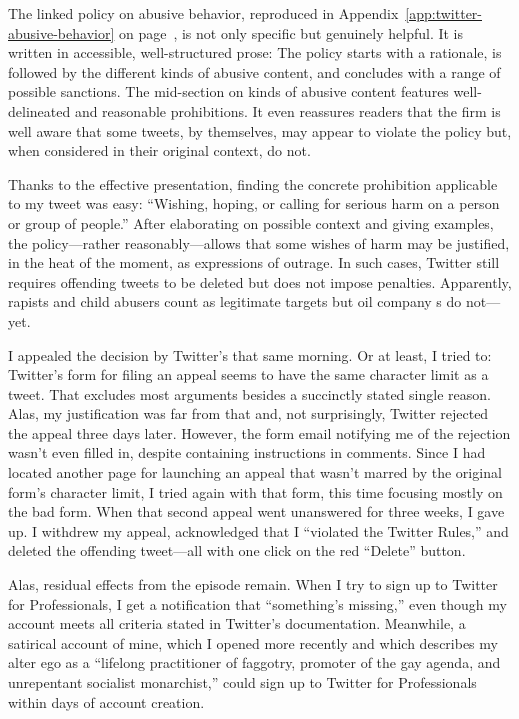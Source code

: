\noindent{}The linked policy on abusive behavior, reproduced in
Appendix~\ref{app:twitter-abusive-behavior} on
page~\pageref{app:twitter-abusive-behavior}, is not only specific but genuinely
helpful. It is written in accessible, well-structured prose: The policy starts
with a rationale, is followed by the different kinds of abusive content, and
concludes with a range of possible sanctions. The mid-section on kinds of
abusive content features well-delineated and reasonable prohibitions. It even
reassures readers that the firm is well aware that some tweets, by themselves,
may appear to violate the policy but, when considered in their original context,
do not.

Thanks to the effective presentation, finding the concrete prohibition
applicable to my tweet was easy: ``Wishing, hoping, or calling for serious harm
on a person or group of people.'' After elaborating on possible context and
giving examples, the policy---rather reasonably---allows that some wishes of
harm may be justified, in the heat of the moment, as expressions of outrage. In
such cases, Twitter still requires offending tweets to be deleted but does not
impose penalties. Apparently, rapists and child abusers count as legitimate
targets but oil company s do not---yet.

I appealed the decision by Twitter's  that same morning. Or at least, I
tried to: Twitter's form for filing an appeal seems to have the same character
limit as a tweet. That excludes most arguments besides a succinctly stated
single reason. Alas, my justification was far from that and, not surprisingly,
Twitter rejected the appeal three days later. However, the form email notifying
me of the rejection wasn't even filled in, despite containing instructions in
 comments. Since I had located another page for launching an appeal that
wasn't marred by the original form's character limit, I tried again with that
form, this time focusing mostly on the bad form. When that second appeal went
unanswered for three weeks, I gave up. I withdrew my appeal, acknowledged that I
``violated the Twitter Rules,'' and deleted the offending tweet---all with one
click on the red ``Delete'' button.

Alas, residual effects from the episode remain. When I try to sign up to Twitter
for Professionals, I get a notification that ``something's missing,'' even
though my account meets all criteria stated in Twitter's documentation.
Meanwhile, a satirical account of mine, which I opened more recently and which
describes my alter ego as a ``lifelong practitioner of faggotry, promoter of the
gay agenda, and unrepentant socialist monarchist,'' could sign up to Twitter for
Professionals within days of account creation.


